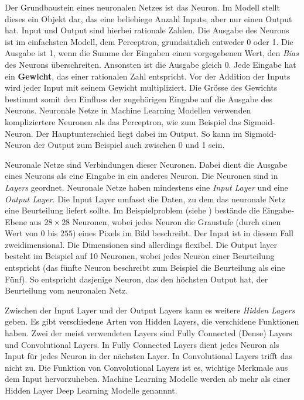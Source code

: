 Der Grundbaustein eines neuronalen Netzes ist das Neuron. Im Modell stellt
dieses ein Objekt dar, das eine beliebiege Anzahl Inputs, aber nur einen Output
hat. Input und Output sind hierbei rationale Zahlen. Die Ausgabe des Neurons ist
im einfachsten Modell, dem Perceptron, grundsätzlich entweder 0 oder 1. Die
Ausgabe ist 1, wenn die Summe der Eingaben einen vorgegebenen Wert, den
\emph{Bias} des Neurons überschreiten. Ansonsten ist die Ausgabe gleich 0. Jede
Eingabe hat ein \textbf{Gewicht}, das einer rationalen Zahl entspricht. Vor der
Addition der Inputs wird jeder Input mit seinem Gewicht multipliziert.  Die
Grösse des Gewichts bestimmt somit den Einfluss der zugehörigen Eingabe auf die
Ausgabe des Neurons. Neuronale Netze in Machine Learning Modellen verwenden
kompliziertere Neuronen als das Perceptron, wie zum Beispiel das Sigmoid-Neuron.
Der Hauptunterschied liegt dabei im Output. So kann im Sigmoid-Neuron der Output
zum Beispiel auch zwischen 0 und 1 sein.

Neuronale Netze sind Verbindungen dieser Neuronen. Dabei dient die Ausgabe eines
Neurons als eine Eingabe in ein anderes Neuron. Die Neuronen sind in
\emph{Layers} geordnet. Neuronale Netze haben mindestens eine \emph{Input Layer}
und eine \emph{Output Layer}. Die Input Layer umfasst die Daten, zu dem das
neuronale Netz eine Beurteilung liefert sollte. Im Beispielproblem (siehe
) bestände die Eingabe-Ebene aus $28\times28$ Neuronen, wobei
jedes Neuron die Graustufe (durch einen Wert von 0 bis $255$) eines Pixels im
Bild beschreibt. Der Input ist in diesem Fall zweidimensional. Die Dimensionen
sind allerdings flexibel. Die Output layer besteht im Beispiel auf 10 Neuronen,
wobei jedes Neuron einer Beurteilung entspricht (das fünfte Neuron beschreibt
zum Beispiel die Beurteilung als eine Fünf). So entspricht dasjenige Neuron, das
den höchsten Output hat, der Beurteilung vom neuronalen Netz.

Zwischen der Input Layer und der Output Layers kann es weitere \emph{Hidden
Layers} geben. Es gibt verschiedene Arten von Hidden Layers, die verschidene
Funktionen haben. Zwei der meist verwendeten Layers sind Fully Connected (Dense)
Layers und Convolutional Layers. In Fully Connected Layers dient jedes Neuron
als Input für jedes Neuron in der nächsten Layer. In Convolutional Layers trifft
das nicht zu. Die Funktion von Convolutional Layers ist es, wichtige Merkmale
aus dem Input hervorzuheben. Machine Learning Modelle werden ab mehr als einer
Hidden Layer Deep Learning Modelle genannnt.


